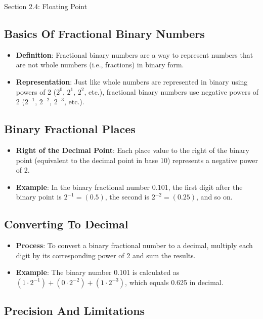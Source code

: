 \begin{notes}{Section 2.4: Floating Point}
    \subsection*{Basics Of Fractional Binary Numbers}

    \begin{itemize}
        \item \textbf{Definition}: Fractional binary numbers are a way to represent numbers that are not whole numbers (i.e., fractions) in binary form.
        \item \textbf{Representation}: Just like whole numbers are represented in binary using powers of 2 ($2^0$, $2^1$, $2^2$, etc.), fractional binary numbers use negative powers of 2 ($2^{-1}$, $2^{-2}$, $2^{-3}$, etc.).
    \end{itemize}

    \subsection*{Binary Fractional Places}

    \begin{itemize}
        \item \textbf{Right of the Decimal Point}: Each place value to the right of the binary point (equivalent to the decimal point in base 10) represents a negative power of 2.
        \item \textbf{Example}: In the binary fractional number 0.101, the first digit after the binary point is $2^{-1} = (0.5)$, the second is $2^{-2} = (0.25)$, and so on.
    \end{itemize}

    \subsection*{Converting To Decimal}

    \begin{itemize}
        \item \textbf{Process}: To convert a binary fractional number to a decimal, multiply each digit by its corresponding power of 2 and sum the results.
        \item \textbf{Example}: The binary number 0.101 is calculated as $(1 \cdot 2^{-1}) + (0 \cdot 2^{-2}) + (1 \cdot 2^{-3})$, which equals 0.625 in decimal.
    \end{itemize}

    \subsection*{Precision And Limitations}


\end{notes}
